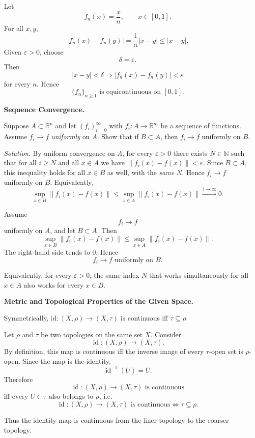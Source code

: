 \begin{solution}
Let
\[
f_n(x)=\frac xn,
\qquad x\in[0,1].
\]
For all \(x,y\),
\[
|f_n(x)-f_n(y)|
=
\frac1n|x-y|
\le|x-y|.
\]
Given \(\varepsilon>0\), choose
\[
\delta=\varepsilon.
\]
Then
\[
|x-y|<\delta
\Longrightarrow
|f_n(x)-f_n(y)|<\varepsilon
\]
for every \(n\). Hence
\[
\boxed{
\{f_n\}_{n\ge1}
\text{ is equicontinuous on }[0,1].
}
\]
\end{solution}


\begin{problem}[CP-II-0398]
\label{prob:cp-ii-0398}
\textbf{Sequence Convergence.}

\hspace*{1.5em}Suppose $A\subset\mathbb{R}^n$ and let $(f_i)_{i=0}^\infty$ with $f_i:A\to\mathbb{R}^m$ be a sequence of functions.
Assume $f_i\to f$ \emph{uniformly} on $A$. Show that if $B\subset A$, then $f_i\to f$ uniformly on $B$.

\textit{Solution.} By uniform convergence on $A$, for every $\varepsilon>0$ there exists $N\in\mathbb{N}$ such that
for all $i\ge N$ and all $x\in A$ we have $\|f_i(x)-f(x)\|<\varepsilon$. Since $B\subset A$, this inequality holds
for all $x\in B$ as well, with the \emph{same} $N$. Hence $f_i\to f$ uniformly on $B$. Equivalently,
\[
\sup_{x\in B}\|f_i(x)-f(x)\|\le \sup_{x\in A}\|f_i(x)-f(x)\|\xrightarrow{i\to\infty} 0.
\]
\end{problem}

\begin{solution}
Assume
\[
f_i\to f
\]
uniformly on \(A\), and let \(B\subset A\). Then
\[
\sup_{x\in B}\|f_i(x)-f(x)\|
\le
\sup_{x\in A}\|f_i(x)-f(x)\|.
\]
The right-hand side tends to \(0\). Hence
\[
\boxed{
f_i\to f
\text{ uniformly on }B.
}
\]

Equivalently, for every \(\varepsilon>0\), the same index \(N\) that works simultaneously
for all \(x\in A\) also works for every \(x\in B\).
\end{solution}


\begin{problem}[CP-II-0399]
\label{prob:cp-ii-0399}
\textbf{Metric and Topological Properties of the Given Space.}

\hspace*{1.5em}Symmetrically, $\mathrm{id}:(X,\rho)\to(X,\tau)$ is continuous iff $\tau\subseteq\rho$.

\bigskip
\end{problem}

\begin{solution}
Let \(\rho\) and \(\tau\) be two topologies on the same set \(X\). Consider
\[
\operatorname{id}:(X,\rho)\to(X,\tau).
\]
By definition, this map is continuous iff the inverse image of every \(\tau\)-open set is
\(\rho\)-open. Since the map is the identity,
\[
\operatorname{id}^{-1}(U)=U.
\]
Therefore
\[
\operatorname{id}:(X,\rho)\to(X,\tau)
\text{ is continuous}
\]
iff every \(U\in\tau\) also belongs to \(\rho\), i.e.
\[
\boxed{
\operatorname{id}:(X,\rho)\to(X,\tau)
\text{ is continuous}
\iff
\tau\subseteq\rho.
}
\]

Thus the identity map is continuous from the finer topology to the coarser topology.
\end{solution}


